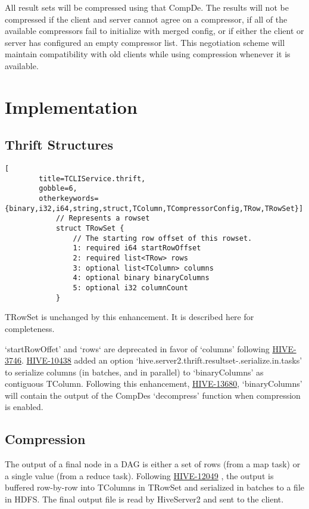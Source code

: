 \documentclass[11pt,a4paper]{article}
\begin{document}
		All result sets will be compressed using that CompDe.
		The results will not be compressed if the client and server cannot agree on a compressor, if all of the available compressors fail to initialize with merged config, or if either the client or server has configured an empty compressor list.
		This negotiation scheme will maintain compatibility with old clients while using compression whenever it is available.
		
		\pagebreak
		
\section{Implementation}
	
	\subsection{Thrift Structures}
		
		\begin{lstlisting}[
		title=TCLIService.thrift,
		gobble=6,
		otherkeywords={binary,i32,i64,string,struct,TColumn,TCompressorConfig,TRow,TRowSet}]
			// Represents a rowset
			struct TRowSet {
				// The starting row offset of this rowset.
				1: required i64 startRowOffset
				2: required list<TRow> rows
				3: optional list<TColumn> columns
				4: optional binary binaryColumns
				5: optional i32 columnCount
			}
		\end{lstlisting}
		
		TRowSet is unchanged by this enhancement. It is described here for completeness.
		
		`startRowOffet' and `rows` are deprecated in favor of `columns' following \href{https://issues.apache.org/jira/browse/HIVE-3746}{HIVE-3746}.
		\href{https://issues.apache.org/jira/browse/HIVE-10438}{HIVE-10438}
		added an option `hive.server2.thrift.resultset-.serialize.in.tasks' to serialize columns (in batches, and in parallel) to `binaryColumns' as contiguous TColumn. Following this enhancement, 
		\href{https://issues.apache.org/jira/browse/HIVE-13680}{HIVE-13680},
		`binaryColumns' will contain the output of the CompDes `decompress' function when compression is enabled.
		
		\subsection{Compression}
		The output of a final node in a DAG is either a set of rows (from a map task) or a single value (from a reduce task).
		Following
		\href{https://issues.apache.org/jira/browse/HIVE-12049}{HIVE-12049}
		, the output is buffered row-by-row into TColumns in TRowSet and serialized in batches to a file in HDFS.
		The final output file is read by HiveServer2 and sent to the client.
		
\end{document}
